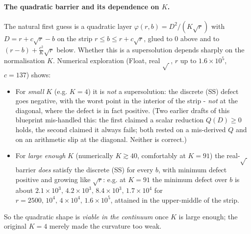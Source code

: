 \documentclass{article}
\begin{document}
\paragraph{The quadratic barrier and its dependence on $K$.}
The natural first guess is a quadratic layer
$\varphi(r,b)=D^2/(K\sqrt r)$ with $D=r+c\sqrt r-b$ on the strip
$r\le b\le r+c\sqrt r$, glued to $0$ above and to $(r-b)+\tfrac{c^2}{K}\sqrt r$ below.
Whether this is a supersolution depends sharply on the normalisation $K$.
Numerical exploration (Float, real $\sqrt{\,}$, $r$ up to $1.6\times10^{5}$,
$c=137$) shows:
\begin{itemize}
  \item For \emph{small} $K$ (e.g. $K=4$) it is \emph{not} a supersolution: the
  discrete (SS) defect goes negative, with the worst point in the interior of the
  strip - \emph{not} at the diagonal, where the defect is in fact positive. (Two
  earlier drafts of this blueprint mis-handled this: the first claimed a scalar
  reduction $Q(D)\ge0$ holds, the second claimed it always fails; both rested on a
  mis-derived $Q$ and on an arithmetic slip at the diagonal. Neither is correct.)
  \item For \emph{large enough} $K$ (numerically $K\gtrsim 40$, comfortably at
  $K=91$) the real-$\sqrt{\,}$ barrier \emph{does} satisfy the discrete (SS) for
  every $b$, with minimum defect positive and growing like $\sqrt r$: e.g. at
  $K=91$ the minimum defect over $b$ is about $2.1\times10^{3},\,4.2\times10^{3},\,
  8.4\times10^{3},\,1.7\times10^{4}$ for $r=2500,\,10^{4},\,4\times10^{4},\,
  1.6\times10^{5}$, attained in the upper-middle of the strip.
\end{itemize}
So the quadratic shape is \emph{viable in the continuum} once $K$ is large enough;
the original $K=4$ merely made the curvature too weak.
\end{document}
